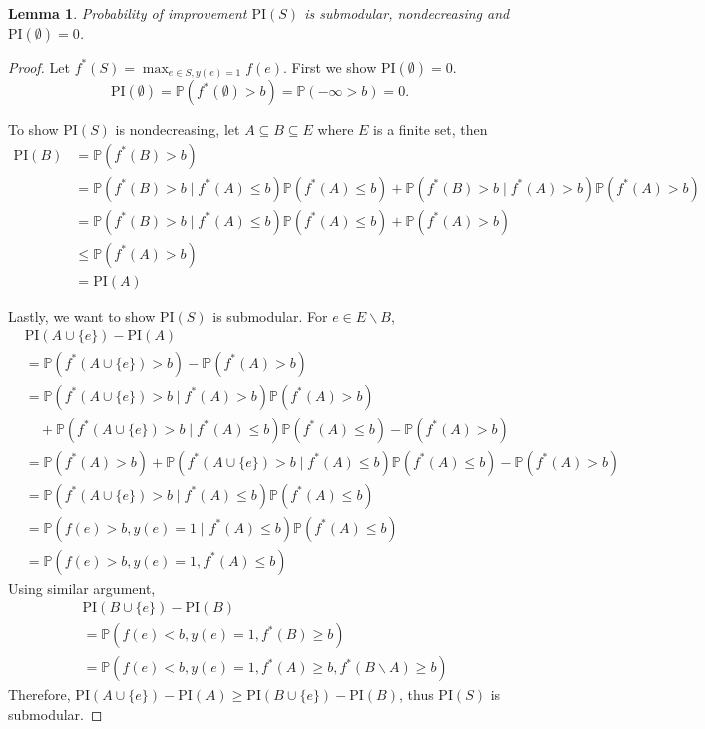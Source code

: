 \documentclass[11pt]{article}
\newcommand{\Prob}{\mathbb{P}}
\newcommand{\PI}{\text{PI}}
\newtheorem{lemma}{Lemma}
\begin{document}
\begin{lemma} 
  Probability of improvement $\PI(S)$ is submodular, nondecreasing and $\PI(\emptyset)=0$.
\end{lemma}
\begin{proof}
Let $f^*(S) = \max_{e \in S, y(e)=1} f(e)$. First we show $\PI(\emptyset) = 0$.
\begin{equation*}
  \PI(\emptyset) = \Prob(f^*(\emptyset) > b) = \Prob(-\infty > b)=0.
\end{equation*}

To show $\PI(S)$ is nondecreasing, let $A \subseteq B \subseteq E$ where $E$ is a finite set, then
\begin{equation*}
\begin{split}
\PI(B) &= \Prob(f^*(B) > b) \\
       &= \Prob(f^*(B) > b \mid f^*(A) \leq b) \Prob(f^*(A) \leq b) + \Prob(f^*(B) > b \mid f^*(A) > b) \Prob(f^*(A) > b) \\
       &= \Prob(f^*(B) > b \mid f^*(A) \leq b) \Prob(f^*(A) \leq b) + \Prob(f^*(A) > b) \\
       &\leq \Prob(f^*(A) > b) \\
       &= \PI(A)
\end{split}
\end{equation*}

Lastly, we want to show $\PI(S)$ is submodular. For $e \in E\backslash B$,
\begin{equation*}
  \begin{split}
    &\PI(A \cup \{e\}) - \PI(A) \\
    &= \Prob(f^*(A \cup \{e\}) > b) - \Prob(f^*(A) > b) \\
    &= \Prob(f^*(A \cup \{e\}) > b \mid f^*(A) > b) \Prob(f^*(A) > b) \\
    &\quad + \Prob(f^*(A \cup \{e\}) > b \mid f^*(A) \leq b)
    \Prob(f^*(A) \leq b) - \Prob(f^*(A) > b) \\
    &=\Prob(f^*(A) > b) + \Prob(f^*(A \cup \{e\}) > b \mid f^*(A)\leq b)
    \Prob(f^*(A)\leq b) -\Prob(f^*(A) > b) \\
    &= \Prob(f^*(A \cup \{e\}) > b \mid f^*(A)\leq b) \Prob(f^*(A)\leq b) \\
    &= \Prob(f(e) > b, y(e) = 1 \mid f^*(A) \leq b) \Prob(f^*(A) \leq b) \\
    &= \Prob(f(e) > b, y(e) = 1, f^*(A) \leq b)
  \end{split}
\end{equation*}
Using similar argument,
\begin{equation*}
\begin{split}
&\PI(B \cup \{e\}) - \PI(B) \\
&= \Prob(f(e)<b, y(e)=1,f^*(B)\geq b) \\
&= \Prob(f(e)<b, y(e)=1,f^*(A)\geq b, f^*(B\backslash A) \geq b )
\end{split}
\end{equation*}
Therefore, $\PI(A \cup \{e\}) - \PI(A) \geq \PI(B \cup \{e\}) - \PI(B)$, thus $\PI(S)$ is submodular. \qedhere
\end{proof}
\end{document}
